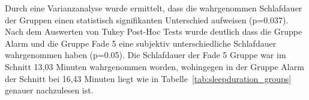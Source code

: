 Durch eine Varianzanalyse wurde ermittelt, dass die wahrgenommen Schlafdauer der Gruppen einen statistisch signifikanten Unterschied aufweisen (p=0.037). Nach dem Auswerten von Tukey Post-Hoc Tests wurde deutlich dass die Gruppe Alarm und die Gruppe Fade 5 eine subjektiv unterschiedliche Schlafdauer wahrgenommen haben (p=0.05). Die Schlafdauer der Fade 5 Gruppe war im Schnitt 13,03 Minuten wahrgenommen worden, wohingegen in der Gruppe Alarm der Schnitt bei 16,43 Minuten liegt wie in Tabelle~\ref{tab:sleepduration_groups} genauer nachzulesen ist. 

